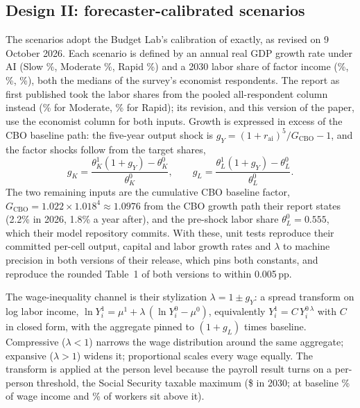 \subsection{Design II: forecaster-calibrated scenarios}\label{sec:method-scenarios}

The scenarios adopt the Budget Lab's calibration of \citet{karger2026}
exactly, as revised on 9 October 2026. Each scenario is defined by an annual
real GDP growth rate under AI (Slow \genInputSlowGrowthPct\%, Moderate
\genInputModGrowthPct\%, Rapid \genInputRapidGrowthPct\%) and a 2030 labor
share of factor income (\genInputSlowLaborSharePct\%,
\genInputModLaborSharePct\%, \genInputRapidLaborSharePct\%), both the
medians of the survey's economist respondents. The report as first published
took the labor shares from the pooled all-respondent column instead
(\genRevModLaborShareOld\% for Moderate, \genRevRapidLaborShareOld\% for
Rapid); its revision, and this version of the paper, use the economist column
for both inputs. Growth is expressed in excess of the CBO
baseline path: the five-year output shock is
$g_Y = (1+r_{\mathrm{ai}})^5 / G_{\mathrm{CBO}} - 1$, and the factor shocks
follow from the target shares,
\begin{equation}
g_K = \frac{\theta^1_K (1+g_Y) - \theta^0_K}{\theta^0_K}, \qquad
g_L = \frac{\theta^1_L (1+g_Y) - \theta^0_L}{\theta^0_L}.
\end{equation}
The two remaining inputs are the cumulative CBO baseline factor,
$G_{\mathrm{CBO}} = 1.022 \times 1.018^4 \approx 1.0976$ from the CBO growth
path their report states (2.2\% in 2026, 1.8\% a year after), and the
pre-shock labor share $\theta^0_L = 0.555$, which their model repository
commits. With these, unit tests reproduce their committed per-cell output,
capital and labor growth rates and $\lambda$ to machine precision in both
versions of their release, which pins both constants, and reproduce the
rounded Table~1 of both versions to within 0.005\,pp.

The wage-inequality channel is their stylization $\lambda = 1 \pm g_Y$: a
spread transform on log labor income,
$\ln Y^1_i = \mu^1 + \lambda\,(\ln Y^0_i - \mu^0)$, equivalently
$Y^1_i = C\,Y_i^{0\,\lambda}$ with $C$ in closed form, with the aggregate
pinned to $(1+g_L)$ times baseline. Compressive ($\lambda<1$) narrows the
wage distribution around the same aggregate; expansive ($\lambda>1$) widens
it; proportional scales every wage equally. The transform is applied at the
person level because the payroll result turns on a per-person threshold, the
Social Security taxable maximum (\$\genSSCap{} in 2030; at baseline
\genShareWagesAboveCapPct\% of wage income and
\genShareWorkersAboveCapPct\% of workers sit above it).

